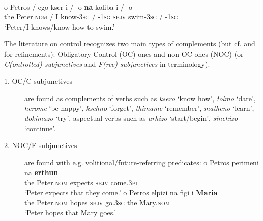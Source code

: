 \documentclass[output=paper]{langsci/langscibook}
\begin{document}
\ea%
 \label{ex:alexiadou:3}
\\
\gll o  Petros / ego  kser-i / -o        \textbf{na}    koliba-i / -o\\
  the    Peter.\textsc{nom} / I  know-\textsc{3sg} / -\textsc{1sg}    \textsc{sbjv}  swim-\textsc{3sg} / -\textsc{1sg}\\
\glt  ‘Peter/I knows/know how to swim.’
\z

The literature on  control recognizes two main types of  complements (but cf. \citealt{Spyropoulos2007} and \citealt{Roussou2009} for refinements): Obligatory Control (OC) ones and non-OC ones (NOC) (or \textit{C(ontrolled)-subjunctives} and \textit{F(ree)-subjunctives} in  terminology).

\begin{description}
\item[1. OC/C-subjunctives] are found as complements of verbs such as \textit{ksero} ‘know how’, \textit{tolmo} ‘dare’, \textit{herome} ‘be happy’, \textit{ksehno} ‘forget’, \textit{thimame} ‘remember’, \textit{matheno} ‘learn’, \textit{dokimazo} ‘try’, aspectual verbs such as \textit{arhizo} ‘start\slash begin’, \textit{sinehizo} ‘continue’.
\ea%
    \label{ex:alexiadou:4}
\z
\z
\item[2. NOC/F-subjunctives] are found with e.g. volitional\slash future-referring predicates:
\ea%
    \label{ex:alexiadou:5}
    \ea\gll o    Petros      perimeni  na    \textbf{erthun}\\
       the    Peter.\textsc{nom} expects  \textsc{sbjv}  come.\textsc{3pl}\\
        \glt ‘Peter expects that they come.’
     \ex\gll  o     Petros    elpizi  na    figi     i     \textbf{Maria}\\
          the    Peter.\textsc{nom}   hopes  \textsc{sbjv}  go.\textsc{3sg}  the    Mary.\textsc{nom}\\
         \glt ‘Peter hopes that Mary goes.’
\z
\z
\end{description}
\end{document}
